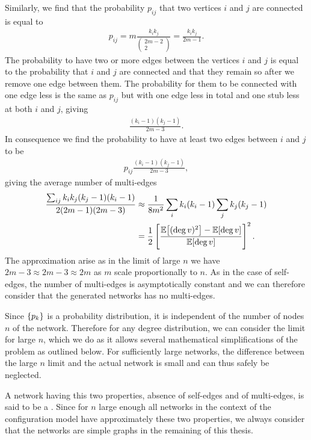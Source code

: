 \documentclass[
11pt, %
english, %
singlespacing, %
nolistspacing, %
liststotoc, %
headsepline, %
]{MastersDoctoralThesis} %
\begin{document}
Similarly, we find that the probability $p_{ij}$ that two vertices $i$ and $j$ are connected is equal to
\begin{align}
	p_{ij} = m \frac{k_i k_j}{ \begin{pmatrix} 2m - 2 \\ 2 \end{pmatrix} } = \frac{k_i k_j}{2 m -1}.
\end{align}
The probability to have two or more edges between the vertices $i$ and $j$ is equal to the probability that $i$ and $j$ are connected and that they remain so after we remove one edge between them. The probability for them to be connected with one edge less is the same as $p_{ij}$ but with one edge less in total and one stub less at both $i$ and $j$, giving
\begin{align}
	\frac{(k_i - 1)(k_j - 1)}{2 m - 3}.
\end{align}
In consequence we find the probability to have at least two edges between $i$ and $j$ to be
\begin{align}
	p_{ij} \frac{(k_i - 1)(k_j - 1)}{2 m - 3},
\end{align}
giving the average number of multi-edges
\begin{align}
	\frac{\sum_{ij} k_i k_j (k_j - 1) (k_i - 1)}{2 (2 m - 1)(2 m - 3)}  &\approx \frac{1}{8 m^2} \sum_i k_i(k_i - 1) \sum_j k_j(k_j - 1) \\
	&= \frac{1}{2}\left[ \frac{\mathbb{E}\!\left[ (\deg{v})^2 \right] - \mathbb{E}\!\left[ \deg{v} \right]}{\mathbb{E}\!\left[ \deg{v} \right]} \right]^2.
\end{align}
The approximation arise as in the limit of large $n$ we have $2 m - 3 \approx 2 m - 3 \approx 2 m$ as $m$ scale proportionally to $n$. As in the case of self-edges, the number of multi-edges is asymptotically constant and we can therefore consider that the generated networks has no multi-edges.

Since $\{p_k\}$ is a probability distribution, it is independent of the number of nodes $n$ of the network. Therefore for any degree distribution, we can consider the limit for large $n$, which we do as it allows several mathematical simplifications of the problem as outlined below. For sufficiently large networks, the difference between the large $n$ limit and the actual network is small and can thus safely be neglected.

A network having this two properties, absence of self-edges and of multi-edges, is said to be a . Since for $n$ large enough all networks in the context of the configuration model have approximately these two properties, we always consider that the networks are simple graphs in the remaining of this thesis.
\end{document}
